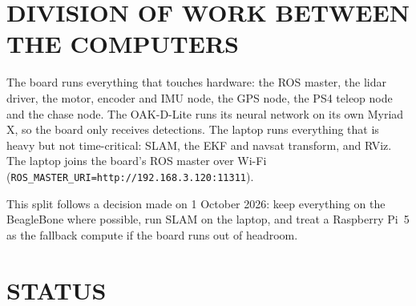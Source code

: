\section{DIVISION OF WORK BETWEEN THE COMPUTERS}

The board runs everything that touches hardware: the ROS master, the lidar
driver, the motor, encoder and IMU node, the GPS node, the PS4 teleop node and
the chase node. The OAK-D-Lite runs its neural network on its own Myriad X, so
the board only receives detections. The laptop runs everything that is heavy
but not time-critical: SLAM, the EKF and navsat transform, and RViz. The
laptop joins the board's ROS master over Wi-Fi
(\texttt{ROS\_MASTER\_URI=http://192.168.3.120:11311}).

This split follows a decision made on 1 October 2026: keep everything on the
BeagleBone where possible, run SLAM on the laptop, and treat a Raspberry Pi~5
as the fallback compute if the board runs out of headroom.

\section{STATUS}

